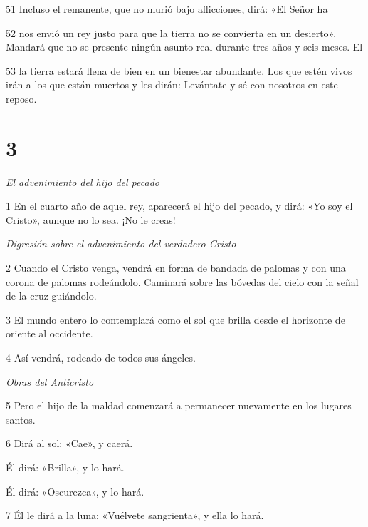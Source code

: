 \par 51 Incluso el remanente, que no murió bajo aflicciones, dirá: «El Señor ha

\par 52 nos envió un rey justo para que la tierra no se convierta en un desierto». Mandará que no se presente ningún asunto real durante tres años y seis meses. El

\par 53 la tierra estará llena de bien en un bienestar abundante. Los que estén vivos irán a los que están muertos y les dirán: Levántate y sé con nosotros en este reposo.

\chapter{3}

\par \textit{El advenimiento del hijo del pecado}

\par 1 En el cuarto año de aquel rey, aparecerá el hijo del pecado, y dirá: «Yo soy el Cristo», aunque no lo sea. ¡No le creas!

\par \textit{Digresión sobre el advenimiento del verdadero Cristo}

\par 2 Cuando el Cristo venga, vendrá en forma de bandada de palomas y con una corona de palomas rodeándolo. Caminará sobre las bóvedas del cielo con la señal de la cruz guiándolo.

\par 3 El mundo entero lo contemplará como el sol que brilla desde el horizonte de oriente al occidente.

\par 4 Así vendrá, rodeado de todos sus ángeles.


\par \textit{Obras del Anticristo}

\par 5 Pero el hijo de la maldad comenzará a permanecer nuevamente en los lugares santos.

\par 6 Dirá al sol: «Cae», y caerá.

\par Él dirá: «Brilla», y lo hará.

\par Él dirá: «Oscurezca», y lo hará.

\par 7 Él le dirá a la luna: «Vuélvete sangrienta», y ella lo hará.


